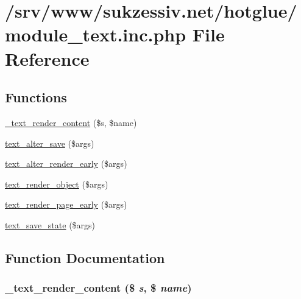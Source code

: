 \hypertarget{module__text_8inc_8php}{
\section{/srv/www/sukzessiv.net/hotglue/module\_\-text.inc.php File Reference}
\label{module__text_8inc_8php}
}
\subsection*{Functions}
\begin{CompactItemize}
\item 
\hyperlink{module__text_8inc_8php_0586b5e177a15f5904d49b8b3aaf19ee}{\_\-text\_\-render\_\-content} (\$s, \$name)
\item 
\hyperlink{module__text_8inc_8php_aee0a89ba2b213f761b05ca2d6460910}{text\_\-alter\_\-save} (\$args)
\item 
\hyperlink{module__text_8inc_8php_c57835ba072c7df9367b2c277d2f5bd7}{text\_\-alter\_\-render\_\-early} (\$args)
\item 
\hyperlink{module__text_8inc_8php_8e9b1db22ff6cb0f3d20815da6aae6ce}{text\_\-render\_\-object} (\$args)
\item 
\hyperlink{module__text_8inc_8php_aaa8b8407d795f6dba9d258f1457ade8}{text\_\-render\_\-page\_\-early} (\$args)
\item 
\hyperlink{module__text_8inc_8php_7fa0ea2ee517914595d7eda355177289}{text\_\-save\_\-state} (\$args)
\end{CompactItemize}


\subsection{Function Documentation}
\hypertarget{module__text_8inc_8php_0586b5e177a15f5904d49b8b3aaf19ee}{
\subsubsection[{\_\-text\_\-render\_\-content}]{\setlength{\rightskip}{0pt plus 5cm}\_\-text\_\-render\_\-content (\$ {\em s}, \/  \$ {\em name})}}
\label{module__text_8inc_8php_0586b5e177a15f5904d49b8b3aaf19ee}


